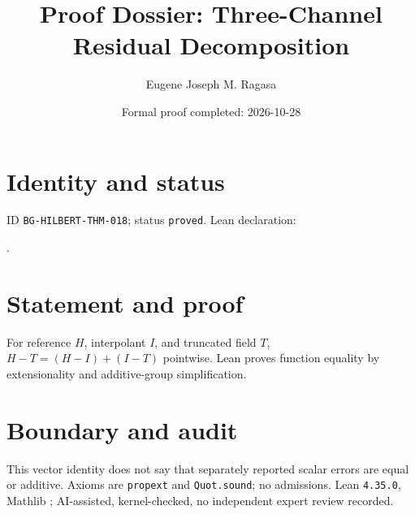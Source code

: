 \documentclass[11pt]{article}
\title{Proof Dossier: Three-Channel Residual Decomposition}\author{Eugene Joseph M. Ragasa}\date{Formal proof completed: 2026-10-28}
\begin{document}
\raggedright\maketitle
\section{Identity and status}
ID \texttt{BG-HILBERT-THM-018}; status \texttt{proved}. Lean declaration:
\par{}.
\section{Statement and proof}
For reference $H$, interpolant $I$, and truncated field $T$, $H-T=(H-I)+(I-T)$ pointwise. Lean proves function equality by extensionality and additive-group simplification.
\section{Boundary and audit}
This vector identity does not say that separately reported scalar errors are equal or additive. Axioms are \texttt{propext} and \texttt{Quot.sound}; no admissions. Lean \texttt{4.35.0}, Mathlib {\scriptsize{}}; AI-assisted, kernel-checked, no independent expert review recorded.
\end{document}
